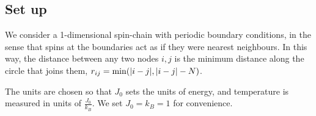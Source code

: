 \subsection{Set up}%
\label{sub:Set up}

We consider a 1-dimensional spin-chain with periodic boundary conditions, in the sense that spins at the boundaries act as if they were nearest neighbours. In this way, the distance between any two nodes $i, j$ is the minimum distance along the circle that joins them, $r_{ij} = \min(\lvert i - j \rvert, \lvert i-j \rvert - N)$.

The units are chosen so that $J_0$ sets the units of energy, and temperature is measured in units of $\frac{J_0}{k_B}$. We set $J_0 = k_B = 1$ for convenience. 
